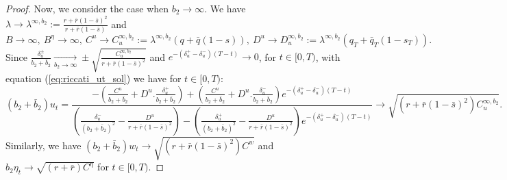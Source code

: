 \documentclass[11pt]{article}
\begin{document}
\begin{proof}
	Now, we consider the case when $b_2 \to \infty$. We have $\displaystyle \lambda \to \lambda^{\infty,b_2}:= \frac{r + \bar{r}(1-\bar{s})^2}{r + \bar{r}(1-\bar{s})}$
	and
	$$ B \to \infty,\ B^{\eta} \to \infty,\ C^u \to C^{\infty,b_2}_u := \lambda^{\infty,b_2}(q+ \bar{q}(1-s)),\ D^u \to D^{\infty,b_2}_u := \lambda^{\infty,b_2}(q_T + \bar{q}_T(1-s_T)).$$
	Since 
	$ \frac{\delta^\pm_u}{b_2 + \bar{b}_2} \xrightarrow[b_2 \to \infty]{} \pm \sqrt{\frac{ C_u^{\infty,b_2}}{r + \bar{r}(1-\bar{s})^2}}$
	and  $e^{- (\delta^+_u - \delta^-_u)(T-t)} \to 0$, for $t \in [0,T)$, with equation (\ref{eq:riccati_ut_sol}) we have for $t \in [0,T)$:
	$$ (b_2 + \bar{b}_2) u_t = \frac{- \left(\frac{C^u}{b_2 + \bar{b}_2} + D^u . \frac{\delta^+_u}{b_2 + \bar{b}_2}\right) + \left(\frac{C^u}{b_2 + \bar{b}_2} + D^u . \frac{\delta^-_u}{b_2 + \bar{b}_2}\right)e^{- (\delta^+_u - \delta^-_u)(T-t)} }
	{ \left(\frac{\delta^-_u}{(b_2 + \bar{b}_2)^2} - \frac{D^u}{r + \bar{r}(1-\bar{s})^2} \right) - \left(\frac{\delta^+_u}{(b_2 + \bar{b}_2)^2} - \frac{D^u}{r + \bar{r}(1-\bar{s})^2} \right)e^{- (\delta^+_u - \delta^-_u)(T-t)}  } \to \sqrt{(r + \bar{r}(1-\bar{s})^2) C_u^{\infty,b_2}}.
	$$
	Similarly, we have $(b_2+\bar{b}_2) w_t \to \sqrt{(r + \bar{r}(1-\bar{s})^2) C^w}$ and $b_2 \eta_t \to \sqrt{(r + \bar{r}) C^\eta}$ for $t \in [0,T)$.


\end{proof}
\end{document}
